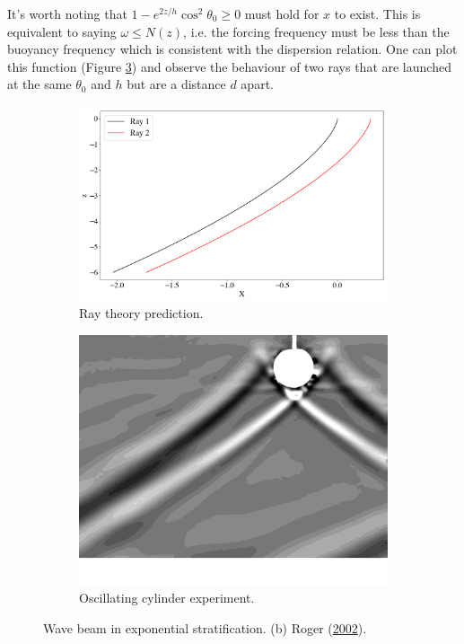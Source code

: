 \documentclass[a4paper]{article}
\numberwithin{equation}{section}
\begin{document}
It's worth noting that $1 - e^{2z/h}\cos^2\theta_0 \geq 0$ must hold for $x$ to exist. This is equivalent to saying $\omega \leq N(z)$, i.e. the forcing frequency must be less than the buoyancy frequency which is consistent with the dispersion relation. One can plot this function (Figure \ref{fig: 9}) and observe the behaviour of two rays that are launched at the same $\theta_0$ and $h$ but are a distance $d$ apart. 
\begin{figure}[h!]
\centering
\begin{subfigure}[t]{.5\textwidth}
  \centering
  \includegraphics[width=1.055\linewidth]{Images/exponential}
  \caption{Ray theory prediction.}
  \label{fig:sub1}
\end{subfigure}%
\begin{subfigure}[t]{.5\textwidth}
  \centering
  \includegraphics[width=0.8\linewidth]{Images/experiment}
  \caption{Oscillating cylinder experiment.}
  \label{fig:sub2}
\end{subfigure}
\caption{Wave beam in exponential stratification. (b) Roger (\protect\hyperlink{ref 50}{2002}).}
\label{fig: 9}
\end{figure}
\end{document}
